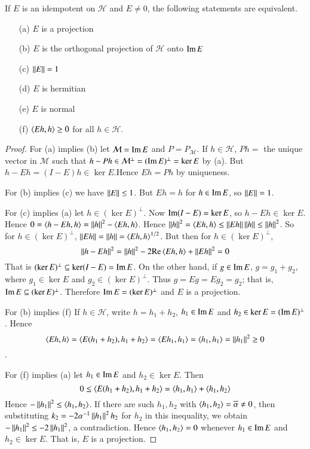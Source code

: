 \begin{prop}
    If $E$ is an idempotent on $\mathscr{H}$ and $E \neq 0$, the following statements are equivalent.
    \begin{enumerate}
        \item[(a)] $E$ is a projection
        \item[(b)] $E$ is the orthogonal projection of $\mathscr{H}$ onto $\operatorname{Im} E$
        \item[(c)] $\left|\left| E\right|\right| = 1$
        \item[(d)] $E$ is hermitian
        \item[(e)] $E$ is normal
        \item[(f)] $\left\langle Eh, h\right\rangle \geq 0$ for all $h \in \mathscr{H}$.
    \end{enumerate}
\end{prop}
\begin{proof}
    For (a) implies (b) let $\mathcal{M} = \operatorname{Im} E$ and $P = P_{\mathcal{M}}$. If $h \in \mathscr{H}$, $Ph = $ the unique vector in $\mathcal{M}$ such that $h-Ph \in \mathcal{M}^{\perp} = (\operatorname{Im} E)^{\perp} = \ker E$ by (a). But $h-Eh = (I-E)h \in \ker E$.Hence $Eh = Ph$ by uniqueness.

    For (b) implies (c) we have $\left|\left| E\right|\right| \leq 1$. But $Eh = h$ for $h \in \operatorname{Im} E$, so $\left|\left| E\right|\right| = 1$.

    For (c) implies (a) let $h \in (\ker E)^{\perp}$. Now $\operatorname{Im}(I-E) = \ker E$, so $h-Eh \in \ker E$. Hence $0 = \left\langle h-Eh, h\right\rangle = \left|\left| h\right|\right|^2-\left\langle Eh, h\right\rangle$. Hence $\left|\left| h\right|\right|^2 = \left\langle Eh, h\right\rangle \leq \left|\left| Eh\right|\right|\left|\left| h\right|\right| \leq \left|\left| h\right|\right|^2$. So for $h \in (\ker E)^{\perp}$, $\left|\left| Eh\right|\right| = \left|\left| h\right|\right| = \left\langle Eh, h\right\rangle^{1/2}$. But then for $h \in (\ker E)^{\perp}$, $$\left|\left| h-Eh\right|\right|^2 = \left|\left| h\right|\right|^2-2\text{Re}\left\langle Eh, h\right\rangle+\left|\left| Eh\right|\right|^2 = 0$$
    That is $(\ker E)^{\perp} \subseteq \ker(I-E) = \operatorname{Im} E$. On the other hand, if $g \in \operatorname{Im} E$, $g = g_1+g_2$, where $g_1 \in \ker E$ and $g_2 \in (\ker E)^{\perp}$. Thus $g = Eg=Eg_2 = g_2$; that is, $\operatorname{Im} E \subseteq (\ker E)^{\perp}$. Therefore $\operatorname{Im} E = (\ker E)^{\perp}$ and $E$ is a projection.

    For (b) implies (f) If $h \in \mathscr{H}$, write $h = h_1+h_2$, $h_1 \in \operatorname{Im} E$ and $h_2 \in \ker E = (\operatorname{Im} E)^{\perp}$. Hence $$\left\langle Eh, h\right\rangle = \left\langle E(h_1+h_2), h_1+h_2\right\rangle = \left\langle Eh_1, h_1\right\rangle = \left\langle h_1, h_1\right\rangle = \left|\left| h_1\right|\right|^2 \geq 0$$.

    For (f) implies (a) let $h_1 \in \operatorname{Im} E$ and $h_2 \in \ker E$. Then $$0 \leq \left\langle E(h_1+h_2), h_1+h_2\right\rangle = \left\langle h_1, h_1\right\rangle+\left\langle h_1, h_2\right\rangle$$
    Hence $-\left|\left| h_1\right|\right|^2 \leq \left\langle h_1, h_2\right\rangle$. If there are such $h_1,h_2$ with $\left\langle h_1, h_2\right\rangle = \overline{\alpha} \neq 0$, then substituting $k_2 = -2\alpha^{-1}\left|\left| h_1\right|\right|^2h_2$ for $h_2$ in this inequality, we obtain $-\left|\left| h_1\right|\right|^2 \leq -2\left|\left| h_1\right|\right|^2$, a contradiction. Hence $\left\langle h_1, h_2\right\rangle = 0$ whenever $h_1 \in \operatorname{Im} E$ and $h_2 \in \ker E$. That is, $E$ is a projection.



\end{proof}
